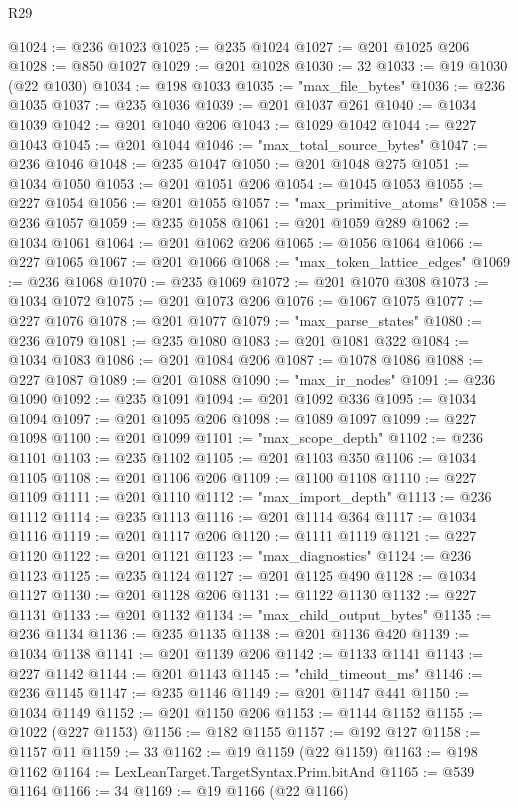 \begin{lexlean}{R29}
\begin{coremodule}
@1024 := @236 @1023
@1025 := @235 @1024
@1027 := @201 @1025 @206
@1028 := @850 @1027
@1029 := @201 @1028
@1030 := 32
@1033 := @19 @1030 (@22 @1030)
@1034 := @198 @1033
@1035 := "max_file_bytes"
@1036 := @236 @1035
@1037 := @235 @1036
@1039 := @201 @1037 @261
@1040 := @1034 @1039
@1042 := @201 @1040 @206
@1043 := @1029 @1042
@1044 := @227 @1043
@1045 := @201 @1044
@1046 := "max_total_source_bytes"
@1047 := @236 @1046
@1048 := @235 @1047
@1050 := @201 @1048 @275
@1051 := @1034 @1050
@1053 := @201 @1051 @206
@1054 := @1045 @1053
@1055 := @227 @1054
@1056 := @201 @1055
@1057 := "max_primitive_atoms"
@1058 := @236 @1057
@1059 := @235 @1058
@1061 := @201 @1059 @289
@1062 := @1034 @1061
@1064 := @201 @1062 @206
@1065 := @1056 @1064
@1066 := @227 @1065
@1067 := @201 @1066
@1068 := "max_token_lattice_edges"
@1069 := @236 @1068
@1070 := @235 @1069
@1072 := @201 @1070 @308
@1073 := @1034 @1072
@1075 := @201 @1073 @206
@1076 := @1067 @1075
@1077 := @227 @1076
@1078 := @201 @1077
@1079 := "max_parse_states"
@1080 := @236 @1079
@1081 := @235 @1080
@1083 := @201 @1081 @322
@1084 := @1034 @1083
@1086 := @201 @1084 @206
@1087 := @1078 @1086
@1088 := @227 @1087
@1089 := @201 @1088
@1090 := "max_ir_nodes"
@1091 := @236 @1090
@1092 := @235 @1091
@1094 := @201 @1092 @336
@1095 := @1034 @1094
@1097 := @201 @1095 @206
@1098 := @1089 @1097
@1099 := @227 @1098
@1100 := @201 @1099
@1101 := "max_scope_depth"
@1102 := @236 @1101
@1103 := @235 @1102
@1105 := @201 @1103 @350
@1106 := @1034 @1105
@1108 := @201 @1106 @206
@1109 := @1100 @1108
@1110 := @227 @1109
@1111 := @201 @1110
@1112 := "max_import_depth"
@1113 := @236 @1112
@1114 := @235 @1113
@1116 := @201 @1114 @364
@1117 := @1034 @1116
@1119 := @201 @1117 @206
@1120 := @1111 @1119
@1121 := @227 @1120
@1122 := @201 @1121
@1123 := "max_diagnostics"
@1124 := @236 @1123
@1125 := @235 @1124
@1127 := @201 @1125 @490
@1128 := @1034 @1127
@1130 := @201 @1128 @206
@1131 := @1122 @1130
@1132 := @227 @1131
@1133 := @201 @1132
@1134 := "max_child_output_bytes"
@1135 := @236 @1134
@1136 := @235 @1135
@1138 := @201 @1136 @420
@1139 := @1034 @1138
@1141 := @201 @1139 @206
@1142 := @1133 @1141
@1143 := @227 @1142
@1144 := @201 @1143
@1145 := "child_timeout_ms"
@1146 := @236 @1145
@1147 := @235 @1146
@1149 := @201 @1147 @441
@1150 := @1034 @1149
@1152 := @201 @1150 @206
@1153 := @1144 @1152
@1155 := @1022 (@227 @1153)
@1156 := @182 @1155
@1157 := @192 @127
@1158 := @1157 @11
@1159 := 33
@1162 := @19 @1159 (@22 @1159)
@1163 := @198 @1162
@1164 := LexLeanTarget.TargetSyntax.Prim.bitAnd
@1165 := @539 @1164
@1166 := 34
@1169 := @19 @1166 (@22 @1166)

\end{coremodule}
\end{lexlean}
